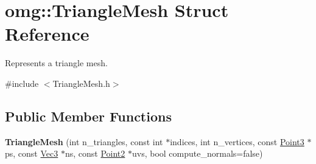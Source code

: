 \hypertarget{structomg_1_1_triangle_mesh}{}\section{omg\+::Triangle\+Mesh Struct Reference}
\label{structomg_1_1_triangle_mesh}


Represents a triangle mesh.  




{\ttfamily \#include $<$Triangle\+Mesh.\+h$>$}

\subsection*{Public Member Functions}
\begin{DoxyCompactItemize}
\item 
\mbox{\label{structomg_1_1_triangle_mesh_a2abd234e8bd5ed7910d4899bef94a2f5}} 
{\bfseries Triangle\+Mesh} (int n\+\_\+triangles, const int $\ast$indices, int n\+\_\+vertices, const \mbox{\hyperlink{namespaceomg_af85242d35fdacf829d32a6f9b95f3e35}{Point3}} $\ast$ps, const \mbox{\hyperlink{namespaceomg_a45a9482677fee9933ff369b49894e316}{Vec3}} $\ast$ns, const \mbox{\hyperlink{namespaceomg_a18e42fb7bbc4159e9137145b866ec578}{Point2}} $\ast$uvs, bool compute\+\_\+normals=false)
\end{DoxyCompactItemize}
